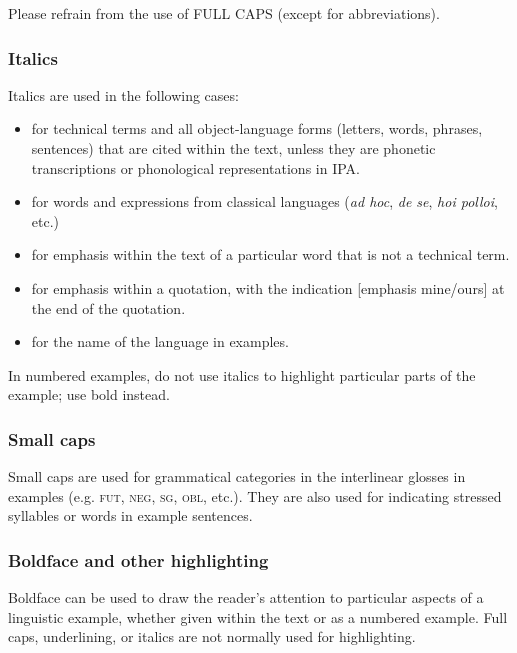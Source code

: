 \documentclass[charis,linguex]{glossa}
\begin{document}
Please refrain from the use of FULL CAPS (except for abbreviations).

\subsubsection{Italics}
Italics are used in the following cases:
\sloppy
\begin{itemize}
\item for technical terms and all object-language forms (letters, words, phrases, sentences) that are cited within the text, unless they are phonetic transcriptions or phonological representations in IPA.
\item for words and expressions from classical languages (\emph{ad hoc}, \emph{de se}, \emph{hoi polloi}, etc.) 
\item for emphasis within the text of a particular word that is not a technical term.
\item for emphasis within a quotation, with the indication [emphasis mine/ours] at the end of the quotation.
\item for the name of the language in examples.
\end{itemize}

In numbered examples, do not use italics to highlight particular parts of the example; use bold instead.

\fussy

\subsubsection{Small caps}

Small caps are used for grammatical categories in the interlinear glosses in examples (e.g. \textsc{fut, neg, sg, obl}, etc.). They are also used for indicating stressed syllables or words in example sentences.

\subsubsection{Boldface and other highlighting}
Boldface can be used to draw the reader’s attention to particular aspects of a linguistic example, whether given within the text or as a numbered example. Full caps, underlining, or italics are not normally used for highlighting.
\end{document}
